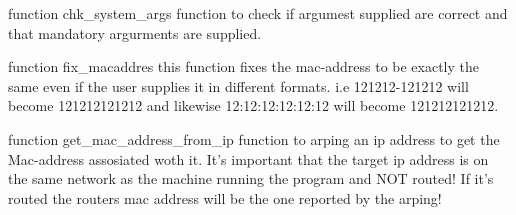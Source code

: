 \documentclass[letterpaper,10pt,english]{sphinxmanual}
\begin{document}
\begin{fulllineitems}
\begin{fulllineitems}

\begin{fulllineitems}
\label{Trace_Functions:Trace_Functions.Tracefunctions.Trace_result.trace_end}
\end{fulllineitems}


\end{fulllineitems}


\begin{fulllineitems}
\label{Trace_Functions:Trace_Functions.Tracefunctions.chk_system_args}
function chk\_system\_args
function to check if argumest supplied are correct and that mandatory argurments are supplied.

\end{fulllineitems}


\begin{fulllineitems}
\label{Trace_Functions:Trace_Functions.Tracefunctions.fix_macaddress}
function fix\_macaddres
this function fixes the mac-address to be exactly the same even if the user supplies it in different formats.
i.e 121212-121212 will become 121212121212 and likewise 12:12:12:12:12:12 will become 121212121212.

\end{fulllineitems}


\begin{fulllineitems}
\label{Trace_Functions:Trace_Functions.Tracefunctions.get_mac_address_from_ip}
function get\_mac\_address\_from\_ip
function to arping an ip address to get the Mac-address assosiated woth it.
It's important that the target ip address is on the same network as the machine running the program and NOT routed!
If it's routed the routers mac address will be the one reported by the arping!

\end{fulllineitems}


\end{fulllineitems}
\end{document}
